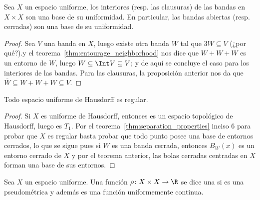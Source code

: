 \documentclass[topologia-analisis.tex]{subfiles}
\begin{document}
\begin{thm}\label{thm:closed_bands_are_base}
	Sea $X$ un espacio uniforme, los interiores (resp. las clausuras) de las bandas en $X \times X$ son una base de su uniformidad.
	En particular, las bandas abiertas (resp. cerradas) son una base de su uniformidad.
\end{thm}
\begin{proof}
	Sea $V$ una banda en $X$, luego existe otra banda $W$ tal que $3W \subseteq V$ (¿por qué?).y el teorema~\ref{thm:entourage_neighborhood} nos dice que
	$W + W + W$ es un entorno de $W$, luego $W \subseteq \Int V \subseteq V$; y de aquí se concluye el caso para los interiores de las bandas.
	Para las clausuras, la proposición anterior nos da que $\overline W \subseteq W + W + W \subseteq V$.
\end{proof}

\begin{thm}
	Todo espacio uniforme de Hausdorff es regular.
\end{thm}
\begin{proof}
	Si $X$ es uniforme de Hausdorff, entonces es un espacio topológico de Hausdorff, luego es $T_1$.
	Por el teorema~\ref{thm:separation_properties} inciso 6 para probar que $X$ es regular basta probar que todo punto posee una base de entornos cerrados,
	lo que se sigue pues si $W$ es una banda cerrada, entonces $B_W(x)$ es un entorno cerrado de $X$ y por el teorema anterior, las bolas cerradas centradas
	en $X$ forman una base de sus entornos.
\end{proof}

\begin{mydef}
	Sea $X$ un espacio uniforme.
	Una función $\rho\colon X \times X \to \R$ se dice una  si es una pseudométrica
	y además es una función uniformemente continua.
\end{mydef}
\end{document}
